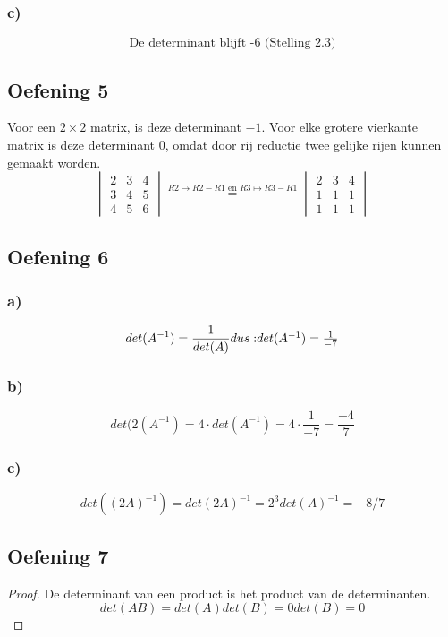 \documentclass[lineaire_algebra_oplossingen.tex]{subfiles}
\begin{document}
\subsubsection*{c)}
\[ \text{De determinant blijft -6 (Stelling 2.3)} \]
\subsection{Oefening 5}
Voor een $2\times2$ matrix, is deze determinant $-1$.
Voor elke grotere vierkante matrix is deze determinant $0$, omdat door rij reductie twee gelijke rijen kunnen gemaakt worden.
\[
\begin{vmatrix}
2 & 3 & 4\\
3 & 4 & 5\\
4 & 5 & 6
\end{vmatrix}
\overset{R2 \longmapsto R2-R1 \text{ en } R3 \longmapsto R3 - R1}{=}
\begin{vmatrix}
2 & 3 & 4\\
1 & 1 & 1\\
1 & 1 & 1
\end{vmatrix}
\]
\subsection{Oefening 6}
\subsubsection*{a)}
\[
det(A^{-1}) = \frac{1}{det(A)} $$
dus:
$$
det(A^{-1}) = \frac{1}{-7} 
\]
\subsubsection*{b)}
$$ det(2(A^{-1}) = 4\cdot det(A^{-1}) = 4 \cdot \frac{1}{-7} = \frac{-4}{7}
$$
\subsubsection*{c)}
\[ det((2A)^{-1}) = det(2A)^{-1} = 2^{3}det(A)^{-1} = -8/7\]
\subsection{Oefening 7}
\begin{proof}
De determinant van een product is het product van de determinanten.
\[
det(AB) = det(A) det(B) = 0 det(B) = 0 
\]
\end{proof}
\end{document}
